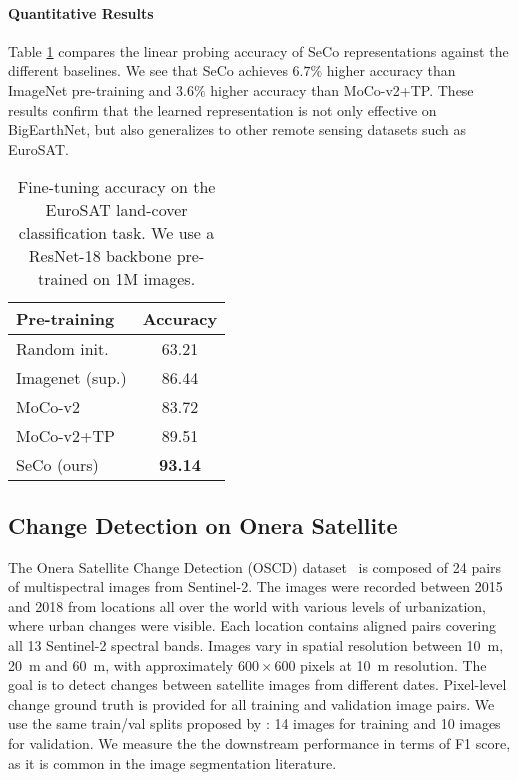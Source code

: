 \documentclass[10pt,twocolumn,letterpaper]{article}
\newcommand{\methodname}[0]{SeCo}
\begin{document}
\vspace{-1em}\paragraph{Quantitative Results}
Table \ref{tab:eurosat_results} compares the linear probing accuracy of \methodname{} representations against the different baselines. We see that \methodname{} achieves $6.7\%$ higher accuracy than ImageNet pre-training and $3.6\%$ higher accuracy than MoCo-v2+TP. These results confirm that the learned representation is not only effective on BigEarthNet, but also generalizes to other remote sensing datasets such as EuroSAT.



\begin{table}[t]
    \begin{center}
    \begin{tabular}{l|c}
        \toprule
        Pre-training & Accuracy \\
        \hline\hline
        Random init. & 63.21 \\
        Imagenet (sup.) & 86.44 \\
        \hline
        MoCo-v2 & 83.72 \\
        MoCo-v2+TP & 89.51 \\
        SeCo (ours) & \textbf{93.14} \\
        \bottomrule
    \end{tabular}
    \end{center}
    \caption{Fine-tuning accuracy on the EuroSAT land-cover classification task. We use a ResNet-18 backbone pre-trained on 1M images.}
    \label{tab:eurosat_results}
\end{table}

\subsection{Change Detection on Onera Satellite}
The Onera Satellite Change Detection (OSCD) dataset~\citep{daudt2018urban} is composed of 24 pairs of multispectral images from Sentinel-2. The images were recorded between 2015 and 2018 from locations all over the world with various levels of urbanization, where urban changes were visible. Each location contains aligned pairs covering all 13 Sentinel-2 spectral bands. Images vary in spatial resolution between 10~m, 20~m and 60~m, with approximately $600 \times 600$ pixels at 10~m resolution. The goal is to detect changes between satellite images from different dates. Pixel-level change ground truth is provided for all training and validation image pairs. We use the same train/val splits proposed by \citet{daudt2018urban}: 14 images for training and 10 images for validation. We measure the the downstream performance in terms of F1 score, as it is common in the image segmentation literature.
\end{document}
